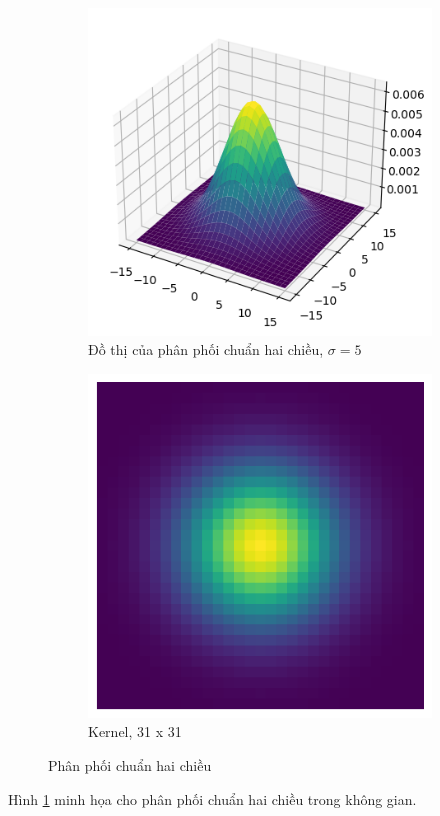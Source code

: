 \documentclass{article}
\begin{document}
    \begin{figure}[ht!]
        \centering
        \begin{subfigure}[b]{0.4\textwidth}
            \includegraphics[width = \textwidth]{download (2).png}
            \caption{Đồ thị của phân phối chuẩn hai chiều, ${\sigma} = 5$}
        \end{subfigure}
        \hfill
        \begin{subfigure}[b]{0.4\textwidth}
            \includegraphics[width = \textwidth]{download (3).png}
            \caption{Kernel, 31 x 31}
        \end{subfigure}
        \caption{Phân phối chuẩn hai chiều}
        \label{fig7}
    \end{figure}
    Hình \ref{fig7} minh họa cho phân phối chuẩn hai chiều trong không gian.
\end{document}
